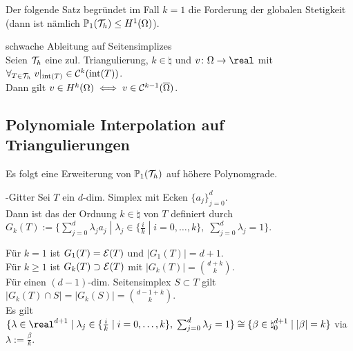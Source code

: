 \linie

\begin{Bem}
    Der folgende Satz begründet im Fall $k = 1$ die Forderung der globalen Stetigkeit
    (dann ist nämlich $\mathbb{P}_1(\mathcal{T}_h) \le H^1(\Omega)$).
\end{Bem}

\begin{Satz}{schwache Ableitung auf Seitensimplizes}\\
    Seien $\mathcal{T}_h$ eine zul. Triangulierung,
    $k \in \natural$ und
    $v\colon \Omega \to \real$ mit
    $\forall_{T \in \mathcal{T}_h}\; v|_{\operatorname{int}(T)} \in \mathcal{C}^k(\operatorname{int}(T))$.\\
    Dann gilt $v \in H^k(\Omega) \iff v \in \mathcal{C}^{k-1}(\overline{\Omega})$.
\end{Satz}

\pagebreak

\subsection{%
    Polynomiale Interpolation auf Triangulierungen%
}

\begin{Bem}
    Es folgt eine Erweiterung von $\mathbb{P}_1(\mathcal{T}_h)$ auf höhere Polynomgrade.
\end{Bem}

\begin{Def}{-Gitter}
    Sei $T$ ein $d$-dim. Simplex mit Ecken $\{a_j\}_{j=0}^d$.\\
    Dann ist das  der Ordnung $k \in \natural$ von $T$
    definiert durch\\
    $G_k(T) := \{\sum_{j=0}^d \lambda_j a_j \;|\;
    \lambda_j \in \{\frac{i}{k} \;|\; i = 0, \dotsc, k\},\; \sum_{j=0}^d \lambda_j = 1\}$.
\end{Def}

\begin{Bem}
    Für $k = 1$ ist $G_1(T) = \mathcal{E}(T)$ und $|G_1(T)| = d+1$.\\
    Für $k \ge 1$ ist $G_k(T) \supset \mathcal{E}(T)$ mit $|G_k(T)| = \binom{d+k}{k}$.\\
    Für einen $(d-1)$-dim. Seitensimplex $S \subset T$ gilt
    $|G_k(T) \cap S| = |G_k(S)| = \binom{d-1+k}{k}$.\\
    Es gilt
    $\{\lambda \in \real^{d+1} \;|\; \lambda_j \in \{\frac{i}{k} \;|\; i = 0, \dotsc, k\},\;
    \sum_{j=0}^d \lambda_j = 1\} \cong
    \{\beta \in \natural_0^{d+1} \;|\; |\beta| = k\}$ via
    $\lambda := \frac{\beta}{k}$.
\end{Bem}

